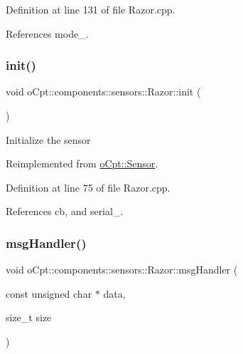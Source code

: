 Definition at line 131 of file Razor.\+cpp.



References mode\+\_\+.

\hypertarget{classo_cpt_1_1components_1_1sensors_1_1_razor_a1dd2b5a9fbac3c9510e2d3771abf358b}{}\label{classo_cpt_1_1components_1_1sensors_1_1_razor_a1dd2b5a9fbac3c9510e2d3771abf358b} 
\subsubsection{\texorpdfstring{init()}{init()}}
{\footnotesize\ttfamily void o\+Cpt\+::components\+::sensors\+::\+Razor\+::init (\begin{DoxyParamCaption}{ }\end{DoxyParamCaption})\hspace{0.3cm}{\ttfamily [virtual]}}

Initialize the sensor 

Reimplemented from \hyperlink{classo_cpt_1_1_sensor_aa612a305a9a3091dd62cd1afb9d4dd7d}{o\+Cpt\+::\+Sensor}.



Definition at line 75 of file Razor.\+cpp.



References cb, and serial\+\_\+.

\hypertarget{classo_cpt_1_1components_1_1sensors_1_1_razor_a8d8e051113a86789851faca74d3da303}{}\label{classo_cpt_1_1components_1_1sensors_1_1_razor_a8d8e051113a86789851faca74d3da303} 
\subsubsection{\texorpdfstring{msg\+Handler()}{msgHandler()}}
{\footnotesize\ttfamily void o\+Cpt\+::components\+::sensors\+::\+Razor\+::msg\+Handler (\begin{DoxyParamCaption}\item[{const unsigned char $\ast$}]{data,  }\item[{size\+\_\+t}]{size }\end{DoxyParamCaption})\hspace{0.3cm}{\ttfamily [private]}}



